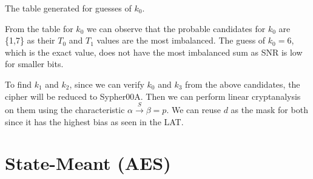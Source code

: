 \documentclass[12pt]{article}
\begin{document}
\begin{large}
\begin{center}
\begin{tabular}{*{17}{c|}}
\end{tabular}

\vspace{0.25cm}

The table generated for guesses of $k_0$.

\end{center}

From the table for $k_0$ we can observe that the probable candidates for $k_0$ are \{1,7\} as their $T_0$ and $T_1$ values are the most imbalanced. The guess of $k_0 = 6$, which is the exact value, does not have the most imbalanced sum as SNR is low for smaller bits.

To find $k_1$ and $k_2$, since we can verify $k_0$ and $k_3$ from the above candidates, the cipher will be reduced to Sypher00A. Then we can perform linear cryptanalysis on them using the characteristic $\alpha \xrightarrow{S} \beta = p$. We can reuse $d$ as the mask for both since it has the highest bias as seen in the LAT.
\end{large}


\section{State-Meant (AES)}
\end{document}
